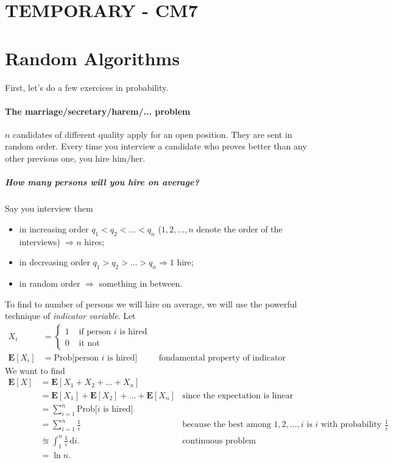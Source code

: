 \part*{TEMPORARY - CM7}

\part{Random Algorithms}

First, let's do a few exercices in probability.



\subsection{The marriage/secretary/harem/... problem}
$n$ candidates of different quality apply for an open position. They are sent in random order. Every time you interview a candidate who proves better than any other previous one, you hire him/her.

\subsubsection{How many persons will you hire on average?}
Say you interview them 
\begin{itemize}
\item in increasing order $q_1 < q_2 < \ldots < q_n$ ($1,2, \ldots, n$ denote the order of the interviews) $\Rightarrow n$ hires;
\item in decreasing order $q_1 > q_2 > \ldots > q_n \Rightarrow 1$ hire;
\item in random order $\Rightarrow$ something in between.
\end{itemize}
To find to number of persons we will hire on average, we will use the powerful technique of \textit{indicator variable}. Let
\begin{align*}
X_i &=
  \left\{
      \begin{aligned}
      	1 &\text{ if person $i$ is hired} \\
        0 &\text{ it not }
      \end{aligned}
    \right.\\
\mathbf{E}[X_i] &= \text{Prob[person $i$ is hired}] &\text{ fondamental property of indicator variable}
\end{align*}
We want to find
\begin{align*}
\mathbf{E}[X] &=  \mathbf{E}[X_1+X_2+\ldots+X_n] & \\
&=  \mathbf{E}[X_1] + \mathbf{E}[X_2] + \ldots +\mathbf{E}[X_n]  &\text{since the expectation is linear}\\
&= \sum_{i=1}^n \text{Prob[$i$ is hired]} &\\
&= \sum_{i=1}^n \frac{1}{i} &\text{because the best among $1,2,\ldots,i$ is $i$ with probability $\frac{1}{i}$}\\
&\approxeq \int_1^n \frac{1}{i}  \, \mathrm{d}i. &\text{continuous problem}\\
&= \ln n. &
\end{align*}

